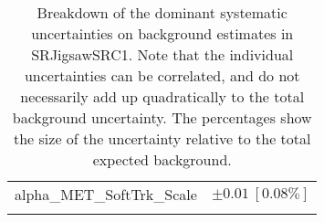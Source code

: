 \begin{table}
\begin{center}
\begin{tabular*}{\textwidth}{@{\extracolsep{\fill}}lc}
alpha\_MET\_SoftTrk\_Scale         & $\pm 0.01\ [0.08\%] $       \\
\noalign{\smallskip}\hline\noalign{\smallskip}
\end{tabular*}
\end{center}
\caption[Breakdown of uncertainty on background estimates]{
Breakdown of the dominant systematic uncertainties on background estimates in SRJigsawSRC1.
Note that the individual uncertainties can be correlated, and do not necessarily add up quadratically to 
the total background uncertainty. The percentages show the size of the uncertainty relative to the total expected background.
\label{table.results.bkgestimate.uncertainties.SRJigsawSRC1}}
\end{table}
%
